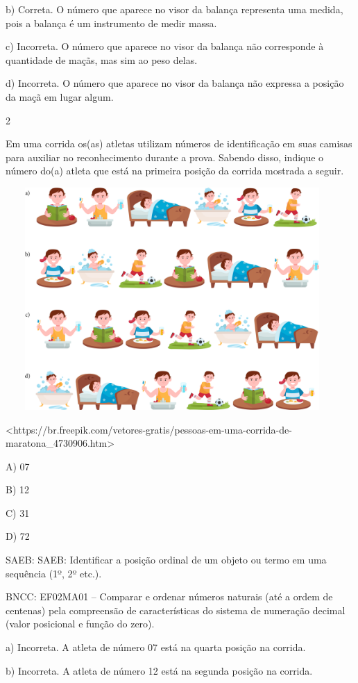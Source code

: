 \begin{escolha}
\begin{escolha}
{{{{{{{{b) Correta. O número que aparece no visor da balança representa uma
medida, pois a balança é um instrumento de medir massa.

c) Incorreta. O número que aparece no visor da balança não corresponde à
quantidade de maçãs, mas sim ao peso delas.

d) Incorreta. O número que aparece no visor da balança não expressa a
posição da maçã em lugar algum.

\num{2}

Em uma corrida os(as) atletas utilizam números de identificação em suas
camisas para auxiliar no reconhecimento durante a prova. Sabendo disso,
indique o número do(a) atleta que está na primeira posição da corrida
mostrada a seguir.

\includegraphics[width=5.00000in,height=3.33333in]{media/image142.png}

\textless{}https://br.freepik.com/vetores-gratis/pessoas-em-uma-corrida-de-maratona\_4730906.htm\textgreater{}

A) 07

B) 12

C) 31

D) 72

SAEB: SAEB: Identificar a posição ordinal de um objeto ou termo
em uma sequência (1º, 2º etc.).

BNCC: EF02MA01 -- Comparar e ordenar números naturais (até a ordem de
centenas) pela compreensão de características do sistema de numeração
decimal (valor posicional e função do zero).

a) Incorreta. A atleta de número 07 está na quarta posição na
corrida.

b) Incorreta. A atleta de número 12 está na segunda posição na
corrida.

}}}}}}}}
\end{escolha}
\end{escolha}
